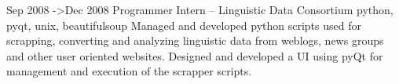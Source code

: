 Sep 2008 ->Dec 2008 Programmer Intern – Linguistic Data Consortium
python, pyqt, unix, beautifulsoup
Managed and developed python scripts used for scrapping, converting and analyzing linguistic data from weblogs, news groups and other user oriented
websites.
Designed and developed a UI using pyQt for management and execution of the scrapper scripts.